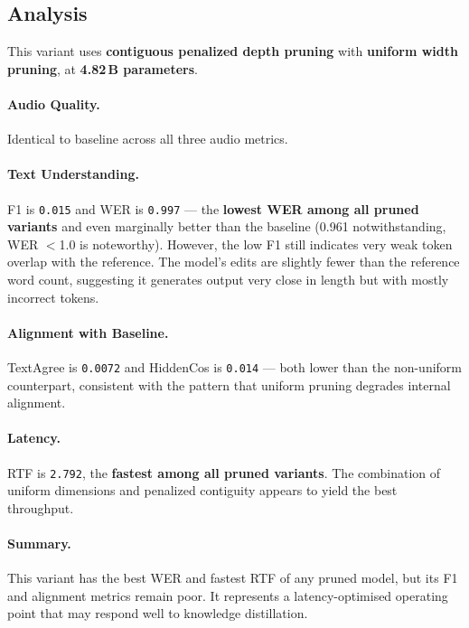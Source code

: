 \documentclass[11pt,a4paper]{article}
\newcommand{\scoreval}[1]{\texttt{#1}}
\begin{document}
\subsection{Analysis}

This variant uses \textbf{contiguous penalized depth pruning} with \textbf{uniform width pruning}, at \textbf{4.82\,B parameters}.

\paragraph{Audio Quality.}
Identical to baseline across all three audio metrics.

\paragraph{Text Understanding.}
F1 is \scoreval{0.015} and WER is \scoreval{0.997} — the \textbf{lowest WER among all pruned variants} and even marginally better than the baseline (0.961 notwithstanding, WER $<$1.0 is noteworthy). However, the low F1 still indicates very weak token overlap with the reference. The model's edits are slightly fewer than the reference word count, suggesting it generates output very close in length but with mostly incorrect tokens.

\paragraph{Alignment with Baseline.}
TextAgree is \scoreval{0.0072} and HiddenCos is \scoreval{0.014} — both lower than the non-uniform counterpart, consistent with the pattern that uniform pruning degrades internal alignment.

\paragraph{Latency.}
RTF is \scoreval{2.792}, the \textbf{fastest among all pruned variants}. The combination of uniform dimensions and penalized contiguity appears to yield the best throughput.

\paragraph{Summary.}
This variant has the best WER and fastest RTF of any pruned model, but its F1 and alignment metrics remain poor. It represents a latency-optimised operating point that may respond well to knowledge distillation.
\end{document}
